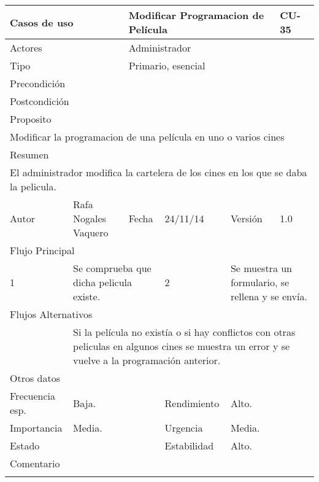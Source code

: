 \documentclass{article}
\begin{document}
\begin{table}[h]
\begin{tabular}{|l|l|l|l|l|l|}
\hline
\multicolumn{2}{|p{2cm}|}{Casos de uso}  & \multicolumn{3}{p{7cm}|}{Modificar Programacion de Película} & CU-35 \\
\hline
\multicolumn{2}{|p{2cm}|}{Actores}       & \multicolumn{4}{p{8cm}|}{Administrador}        \\
\hline
\multicolumn{2}{|p{2cm}|}{Tipo}          & \multicolumn{4}{p{8cm}|}{Primario, esencial}        \\
\hline
\multicolumn{2}{|p{2cm}|}{Precondición}  & \multicolumn{4}{p{8cm}|}{}        \\
\hline
\multicolumn{2}{|p{2cm}|}{Postcondición} & \multicolumn{4}{p{8cm}|}{}        \\
\hline
\multicolumn{6}{|p{10cm}|}{Proposito}                                   \\
\hline
\multicolumn{6}{|p{10cm}|}{Modificar la programacion de una película en uno o varios cines}                                            \\
\hline
\multicolumn{6}{|p{10cm}|}{Resumen}                                 \\
\hline
\multicolumn{6}{|p{10cm}|}{El administrador modifica la cartelera de los cines en los que se daba la pelicula.}                                            \\
\hline
Autor         &       Rafa Nogales Vaquero        &  Fecha   &  24/11/14   &   Versión  & 1.0\\
\hline
\multicolumn{6}{|p{10cm}|}{Flujo Principal}\\
\hline
\multicolumn{1}{|p{1cm}|}{1} & \multicolumn{2}{p{3cm}}{Se comprueba que dicha pelicula existe.} & \multicolumn{1}{|p{1cm}|}{2} & \multicolumn{2}{p{3cm}|}{Se muestra un formulario, se rellena y se envía.}\\
\hline
\multicolumn{6}{|p{10cm}|}{Flujos Alternativos}\\
\hline
\multicolumn{1}{|p{1cm}}{} & \multicolumn{5}{|p{9cm}|}{Si la película no existía o si hay conflictos con otras peliculas en algunos cines se muestra un error y se vuelve a la programación anterior.}\\
\hline
\multicolumn{6}{|p{10cm}|}{Otros datos}\\
\hline
\multicolumn{1}{|p{2cm}|}{Frecuencia esp.} & \multicolumn{2}{p{3cm}}{Baja.} & \multicolumn{1}{|p{2cm}|}{Rendimiento} & \multicolumn{2}{p{3cm}|}{Alto.}\\
\hline
\multicolumn{1}{|p{2cm}|}{Importancia} & \multicolumn{2}{p{3cm}}{Media.} & \multicolumn{1}{|p{2cm}|}{Urgencia} & \multicolumn{2}{p{3cm}|}{Media.}\\
\hline
\multicolumn{1}{|p{2cm}|}{Estado} & \multicolumn{2}{p{3cm}}{} & \multicolumn{1}{|p{2cm}|}{Estabilidad} & \multicolumn{2}{p{3cm}|}{Alto.}\\
\hline
\multicolumn{6}{|p{10cm}|}{Comentario}\\
\hline
\multicolumn{6}{|p{10cm}|}{}\\
\hline
\end{tabular}
\end{table}
\end{document}
